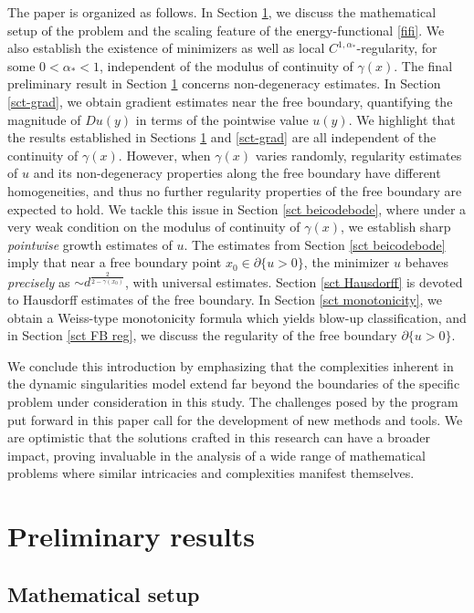 \documentclass[reqno,11pt]{amsart}
\newcommand{\1}{\mathds{1}}
\numberwithin{equation}{section}
\begin{document}
The paper is organized as follows. In Section \ref{prelim-sect}, we discuss the mathematical setup of the problem and the scaling feature of the energy-functional \eqref{fifi}. We also establish the existence of minimizers as well as local $C^{1,\alpha_\ast}$-regularity, for some $0<\alpha_\ast<1$, independent of the modulus of continuity of $\gamma(x)$. The final preliminary result in Section \ref{prelim-sect} concerns non-degeneracy estimates. In Section \ref{sct-grad}, we obtain gradient estimates near the free boundary, quantifying the magnitude of $Du(y)$ in terms of the pointwise value $u(y)$. We highlight that the results established in Sections \ref{prelim-sect} and \ref{sct-grad} are all independent of the continuity of $\gamma(x)$. However, when $\gamma(x)$ varies randomly, regularity estimates of $u$ and its non-degeneracy properties along the free boundary have different homogeneities, and thus no further regularity properties of the free boundary are expected to hold. We tackle this issue in Section \ref{sct beicodebode}, where under a very weak condition on the modulus of continuity of $\gamma(x)$, we establish sharp {\it pointwise} growth estimates of $u$. The estimates from Section \ref{sct beicodebode} imply that near a free boundary point $x_0 \in \partial \{u>0 \}$, the minimizer $u$ behaves {\it precisely} as $\sim d^{\frac{2}{2-\gamma(x_0)}}$, with universal estimates. Section \ref{sct Hausdorff} is devoted to Hausdorff estimates of the free boundary. In Section \ref{sct monotonicity}, we obtain a Weiss-type monotonicity formula which yields blow-up classification, and in Section \ref{sct FB reg}, we discuss the regularity of the free boundary $\partial \{u>0 \}$. 

We conclude this introduction by emphasizing that the complexities inherent in the dynamic singularities model extend far beyond the boundaries of the specific problem under consideration in this study. The challenges posed by the program put forward in this paper call for the development of new methods and tools. We are optimistic that the solutions crafted in this research can have a broader impact, proving invaluable in the analysis of a wide range of mathematical problems where similar intricacies and complexities manifest themselves.

\section{Preliminary results}\label{prelim-sect}

\subsection{Mathematical setup} 
\end{document}
